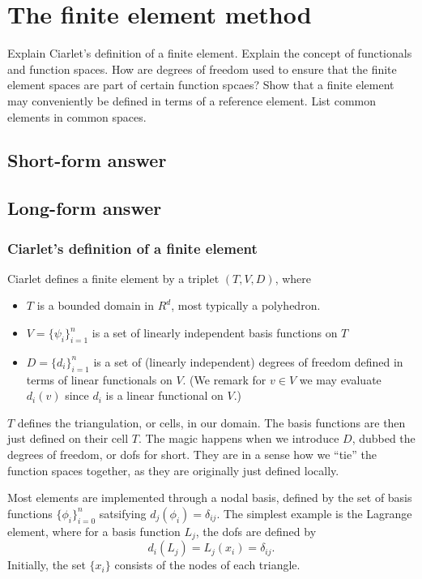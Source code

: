 \section{The finite element method}
Explain Ciarlet's definition of a finite element.
Explain the concept of functionals and function spaces.
How are degrees of freedom used to ensure that the finite element spaces are part of certain function spcaes?
Show that a finite element may conveniently be defined in terms of a reference element.
List common elements in common spaces.

\subsection{Short-form answer}


\newpage
\subsection{Long-form answer}

\subsubsection{Ciarlet's definition of a finite element}
Ciarlet defines a finite element by a triplet $(T, V , D)$, where
\begin{itemize}
    \item
        $T$ is a bounded domain in $R^d$, most typically a polyhedron.

    \item
        $V = \{\psi_i\}_{i = 1}^n$ is a set of linearly independent basis functions on $T$

    \item
        $D = \{d_i\}_{i = 1}^n$ is a set of (linearly independent) degrees of freedom defined in terms of linear functionals on $V$.
        (We remark for $v \in V$ we may evaluate $d_i(v)$ since $d_i$ is a linear functional on $V$.)
\end{itemize}
$T$ defines the triangulation, or cells, in our domain.
The basis functions are then just defined on their cell $T$.
The magic happens when we introduce $D$, dubbed the degrees of freedom, or dofs for short.
They are in a sense how we ``tie'' the function spaces together, as they are originally just defined locally.

Most elements are implemented through a nodal basis, defined by the set of basis functions $\{\phi_i\}_{i = 0}^n$ satsifying $d_j(\phi_i) = \delta_{ij}$.
The simplest example is the Lagrange element, where for a basis function $L_j$, the dofs are defined by
\begin{equation}
    d_i(L_j) = L_j(x_i) = \delta_{ij}.
\end{equation}
Initially, the set $\{x_i\}$ consists of the nodes of each triangle.

